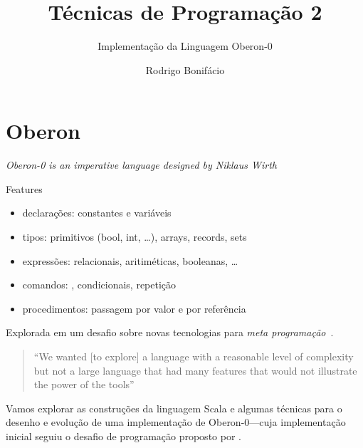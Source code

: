 \documentclass{beamer}
\title{T\'{e}cnicas de Programa\c c\~{a}o 2}
\subtitle{Implementa\c c\~{a}o da Linguagem Oberon-0}
\author{Rodrigo Bonif\'{a}cio}
\begin{document}
\begin{frame}
 \titlepage
\end{frame}

\section{Oberon}

\begin{frame}

  \emph{Oberon-0 is an imperative language designed by Niklaus Wirth}~\citep{wirth1996compiler,ldta-scp} \pause

  \begin{block}{Features}
     \begin{itemize}
      \item declara\c c\~{o}es: constantes e vari\'{a}veis
      \item tipos: primitivos (bool, int, \ldots), arrays, records, sets
      \item express\~{o}es: relacionais, aritim\'{e}ticas, booleanas, \ldots
      \item comandos: , condicionais, repeti\c c\~{a}o
      \item procedimentos: passagem por valor e por refer\^{e}ncia  
     \end{itemize}
  \end{block}
  \pause
  

  \begin{center}
  Explorada em um desafio sobre novas tecnologias para
     \emph{meta programa\c c\~{a}o}~\citep{ldta-scp}. 
  \end{center}
  
\end{frame}

\begin{frame}
  \begin{quotation}
    ``We wanted [to explore] a language with a
    reasonable level of complexity but not a large language that
    had many features that would not illustrate the power of the tools''
  \end{quotation}
  \begin{flushright}
    \citep{ldta-scp}
  \end{flushright} \pause

  Vamos explorar as constru\c c\~{o}es da linguagem Scala e
  algumas t\'{e}cnicas para o
  {\color{blue}desenho} e {\color{blue}evolu\c c\~{a}o}
  de uma implementa\c c\~{a}o de Oberon-0\pause---cuja implementa\c c\~{a}o inicial seguiu o desafio de programa\c c\~{a}o proposto por  \citet{ldta-scp}.
\end{frame}
\end{document}

